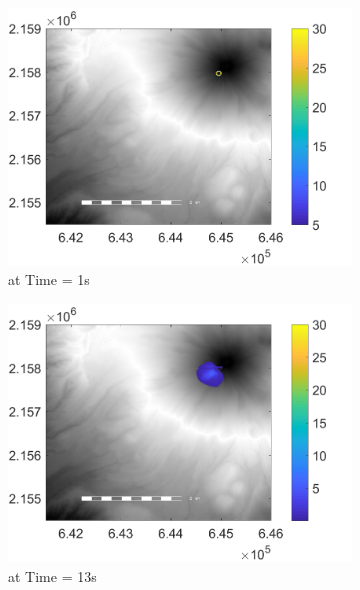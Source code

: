 \begin{figure}[H]
\centering
\begin{subfigure}{0.46\textwidth}
\centering
\includegraphics[width=\textwidth]{dem_figs/newres_1}
\caption{at Time = 1s}
\end{subfigure}
\begin{subfigure}{0.46\textwidth}
\centering
\includegraphics[width=\textwidth]{dem_figs/newres_13}
\caption{at Time = 13s} 
\end{subfigure} \\
\begin{subfigure}{0.46\textwidth}
\centering

\end{subfigure}
\end{figure}
